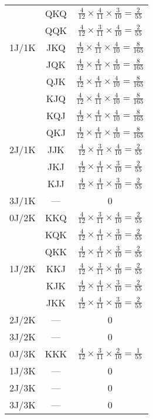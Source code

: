 \documentclass{article}
\begin{document}
\begin{enumerate}
\begin{center}
\begin{tabular}{c|c|c}
	& QKQ & $\frac{4}{12}\times\frac{4}{11}\times\frac{3}{10}=\frac{2}{55}$\\
	& QQK & $\frac{4}{12}\times\frac{3}{11}\times\frac{4}{10}=\frac{2}{55}$\\
\hline
1J/1K & JKQ & $\frac{4}{12}\times\frac{4}{11}\times\frac{4}{10}=\frac{8}{165}$\\
	& JQK & $\frac{4}{12}\times\frac{4}{11}\times\frac{4}{10}=\frac{8}{165}$\\
	& QJK & $\frac{4}{12}\times\frac{4}{11}\times\frac{4}{10}=\frac{8}{165}$\\
	& KJQ & $\frac{4}{12}\times\frac{4}{11}\times\frac{4}{10}=\frac{8}{165}$\\
	& KQJ & $\frac{4}{12}\times\frac{4}{11}\times\frac{4}{10}=\frac{8}{165}$\\
	& QKJ & $\frac{4}{12}\times\frac{4}{11}\times\frac{4}{10}=\frac{8}{165}$\\
\hline
2J/1K & JJK & $\frac{4}{12}\times\frac{3}{11}\times\frac{4}{10}=\frac{2}{55}$\\
	& JKJ & $\frac{4}{12}\times\frac{4}{11}\times\frac{3}{10}=\frac{2}{55}$\\
	& KJJ & $\frac{4}{12}\times\frac{4}{11}\times\frac{3}{10}=\frac{2}{55}$\\
\hline
3J/1K & --- & 0\\
\hline
0J/2K & KKQ & $\frac{4}{12}\times\frac{3}{11}\times\frac{4}{10}=\frac{2}{55}$\\
	& KQK & $\frac{4}{12}\times\frac{4}{11}\times\frac{3}{10}=\frac{2}{55}$\\
	& QKK & $\frac{4}{12}\times\frac{4}{11}\times\frac{3}{10}=\frac{2}{55}$\\
\hline
1J/2K & KKJ & $\frac{4}{12}\times\frac{3}{11}\times\frac{4}{10}=\frac{2}{55}$\\
	& KJK & $\frac{4}{12}\times\frac{4}{11}\times\frac{3}{10}=\frac{2}{55}$\\
	& JKK & $\frac{4}{12}\times\frac{4}{11}\times\frac{3}{10}=\frac{2}{55}$\\
\hline
2J/2K & --- & 0\\
\hline
3J/2K & --- & 0\\
\hline
0J/3K & KKK & $\frac{4}{12}\times\frac{3}{11}\times\frac{2}{10}=\frac{1}{55}$\\
\hline
1J/3K & --- & 0\\
\hline
2J/3K & --- & 0\\
\hline
3J/3K & --- & 0\\
\end{tabular}\\

\end{center}
\end{enumerate}
\end{document}
